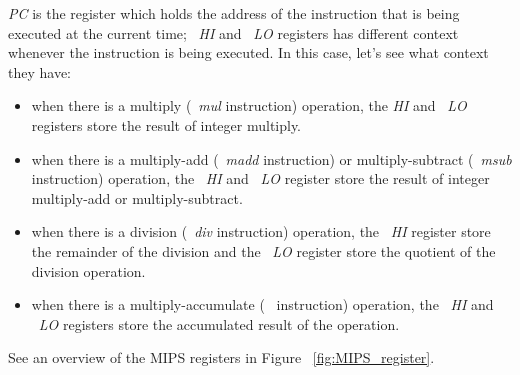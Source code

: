 \documentclass[
  oneside,
  11pt, a4paper,
  footinclude=true,
  headinclude=true,
  cleardoublepage=empty
]{scrbook}
\begin{document}
\textit{PC} is the register which holds the address of the instruction that is being executed at the current time; ~\textit{HI} and ~\textit{LO} registers has different context whenever the instruction is being executed.
In this case, let's see what context they have:
\begin{itemize}
\item when there is a multiply (~\textit{mul} instruction) operation, the \textit{HI} and  ~\textit{LO}  registers store the result of integer multiply.
\item when there is a multiply-add (~\textit{madd} instruction) or multiply-subtract (~\textit{msub} instruction) operation, the ~\textit{HI} and ~\textit{LO} register store the result of integer multiply-add or multiply-subtract.
\item when there is a division (~\textit{div} instruction) operation, the ~\textit{HI} register store the remainder of the division and the ~\textit{LO} register store the quotient of the division operation.
\item when there is a multiply-accumulate (~\textit{} instruction) operation, the ~\textit{HI} and ~\textit{LO} registers store the accumulated result of the operation.
\end{itemize}

See an overview of the MIPS registers in Figure ~\ref{fig:MIPS_register}.
\end{document}
